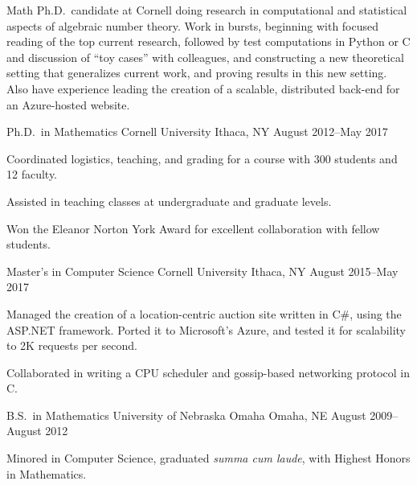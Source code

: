 \documentclass[11pt, letterpaper]{awesome-cv}
\begin{document}
\makecvheader





\begin{cvparagraph}

Math Ph.D.~candidate at Cornell doing research in computational and statistical aspects of algebraic number theory. Work in bursts, beginning with focused reading of the top current research, followed by test computations in Python or C and discussion of ``toy cases'' with colleagues, and constructing a new theoretical setting that generalizes current work, and proving results in this new setting. Also have experience leading the creation of a scalable, distributed back-end for an Azure-hosted website.
\end{cvparagraph}






\begin{cventries}

\cventry
	{Ph.D.~in Mathematics}
	{Cornell University}
	{Ithaca, NY}
	{August 2012--May 2017}
	{
		\begin{cvitems}
			\item{Coordinated logistics, teaching, and grading for a course with 300 students and 12 faculty.}
			\item{Assisted in teaching classes at undergraduate and graduate levels.}
			\item{Won the Eleanor Norton York Award for excellent collaboration with fellow students.}
		\end{cvitems}
	}
	
\cventry
	{Master's in Computer Science}
	{Cornell University}
	{Ithaca, NY}
	{August 2015--May 2017}
	{
		\begin{cvitems}
			\item{Managed the creation of a location-centric auction site written in C\#, using the ASP.NET framework. Ported it to Microsoft's Azure, and tested it for scalability to 2K requests per second.}
			\item{Collaborated in writing a CPU scheduler and gossip-based networking protocol in C.}
		\end{cvitems}
	}
	
\cventry
	{B.S.~in Mathematics}
	{University of Nebraska Omaha}
	{Omaha, NE}
	{August 2009--August 2012}
	{
		\begin{cvitems}
			\item{Minored in Computer Science, graduated \emph{summa cum laude}, with Highest Honors in Mathematics.}
		\end{cvitems}
	}
	
\end{cventries}
\end{document}

